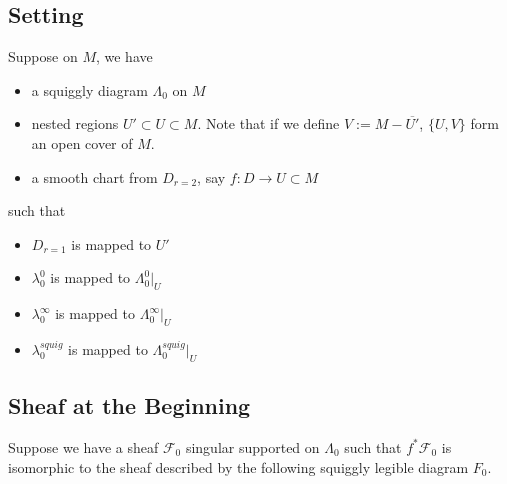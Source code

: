\subsection{Setting}
Suppose on $M$, we have
\begin{itemize}
\item  a squiggly diagram $\Lambda_0$ on $M$

\item nested regions $U' \subset U \subset M$. Note that if we define $V:= M - \overline{U'}$, $\{U,V\}$ form an open cover of $M$.

\item a smooth chart from $D_{r=2}$, say $f: D  \rightarrow U \subset M$
\end{itemize}
such that 
\begin{itemize}
\item $D_{r=1}$ is mapped to $U'$ 

\item $\lambda_0^0$ is mapped to $\Lambda_0^0 |_{U}$

\item $\lambda_0^\infty$ is mapped to $\Lambda_0^\infty |_{U}$

\item $\lambda_0^{squig}$ is mapped to $\Lambda_0^{squig} |_{U}$
\end{itemize}

\subsection{Sheaf at the Beginning}
Suppose we have a sheaf $\mathscr{F}_0$ singular supported on $\Lambda_0$ such that $f^*\mathscr{F}_0$ is isomorphic to the sheaf described by the following squiggly legible diagram $F_0$.

